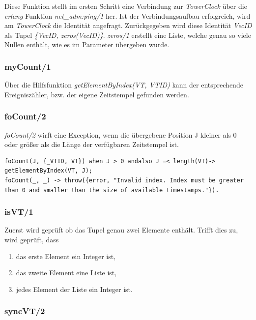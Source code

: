 Diese Funktion stellt im ersten Schritt eine Verbindung zur \textit{TowerClock} über die \textit{erlang} Funktion \textit{net\_adm:ping/1} her. Ist der Verbindungsaufbau erfolgreich, wird am \textit{TowerClock} die Identität angefragt. Zurückgegeben wird diese Identität \textit{VecID} als Tupel \textit{\{VecID, zeros(VecID)\}}. \textit{zeros/1} erstellt eine Liste, welche genau so viele Nullen enthält, wie es im Parameter übergeben wurde.

\subsubsection{myCount/1}

Über die Hilfsfunktion \textit{getElementByIndex(VT, VTID)} kann der entsprechende Ereigniszähler, bzw. der eigene Zeitstempel gefunden werden.

\subsubsection{foCount/2}

\textit{foCount/2} wirft eine Exception, wenn die übergebene Position J kleiner als 0 oder größer als die Länge der verfügbaren Zeitstempel ist.

\begin{lstlisting}
foCount(J, {_VTID, VT}) when J > 0 andalso J =< length(VT)-> getElementByIndex(VT, J);
foCount(_, _) -> throw({error, "Invalid index. Index must be greater than 0 and smaller than the size of available timestamps."}).
\end{lstlisting}

\subsubsection{isVT/1}

Zuerst wird geprüft ob das Tupel genau zwei Elemente enthält. Trifft dies zu, wird geprüft, dass
\begin{enumerate}
    \item das erste Element ein Integer ist,
    \item das zweite Element eine Liste ist,
    \item jedes Element der Liste ein Integer ist.
\end{enumerate}

\subsubsection{syncVT/2} \label{syncVT_realisierung}

